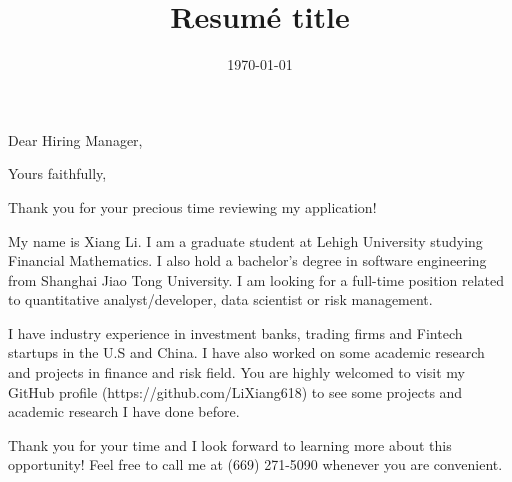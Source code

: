 \documentclass[11pt,a4paper,sans]{moderncv}        %
\title{Resumé title}                               %
\begin{document}
\date{\today}
\opening{Dear Hiring Manager,}
\closing{Yours faithfully,}

\makelettertitle

Thank you for your precious time reviewing my application!

My name is Xiang Li. I am a graduate student at Lehigh University studying Financial Mathematics. I also hold a bachelor's degree in software engineering from Shanghai Jiao Tong University. I am looking for a full-time position related to quantitative analyst/developer, data scientist or risk management.

I have industry experience in investment banks, trading firms and Fintech startups in the U.S and China. I have also worked on some academic research and projects in finance and risk field. You are highly welcomed to visit my GitHub profile (https://github.com/LiXiang618) to see some projects and academic research I have done before.

Thank you for your time and I look forward to learning more about this opportunity! Feel free to call me at (669) 271-5090 whenever you are convenient. 


\makeletterclosing
\end{document}

